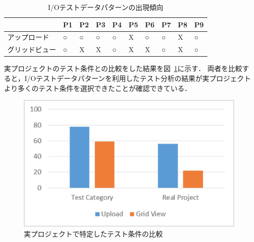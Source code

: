 \begin{table}[htbp]
  \centering
  \caption{I/Oテストデータパターンの出現傾向}
    \begin{tabular}{|p{7em}|p{1.7em}|p{1.7em}|p{1.7em}|p{1.7em}|p{1.7em}|p{1.7em}|p{1.7em}|p{1.7em}|p{1.7em}|}
    \hline
    \multicolumn{1}{|r|}{} & \multicolumn{1}{l|}{P1} & \multicolumn{1}{l|}{P2} & \multicolumn{1}{l|}{P3} & \multicolumn{1}{l|}{P4} & \multicolumn{1}{l|}{P5} & \multicolumn{1}{l|}{P6} & \multicolumn{1}{l|}{P7} & \multicolumn{1}{l|}{P8} & \multicolumn{1}{l|}{P9} \bigstrut\\
    \hline
    \hline
    アップロード & ○     & ○     & ○     & ○     & X     & ○     & ○     & X     & ○ \bigstrut\\
    \hline
    グリッドビュー & ○     & X     & X     & ○     & X     & X     & ○     & X     & ○ \bigstrut\\
    \hline
    \end{tabular}%
  \label{tab:D-4-IOresult}%
\end{table}%

実プロジェクトのテスト条件との比較をした結果を図~\ref{fig:D-4-Fig10}に示す．
両者を比較すると，I/Oテストデータパターンを利用したテスト分析の結果が実プロジェクトより多くのテスト条件を選択できたことが確認できている．

\begin{figure}[htbp]
\begin{center}
\includegraphics[width=12cm]{./image/D-4-Fig10.png}
\caption{実プロジェクトで特定したテスト条件の比較}
\label{fig:D-4-Fig10}
\end{center}
\end{figure}

